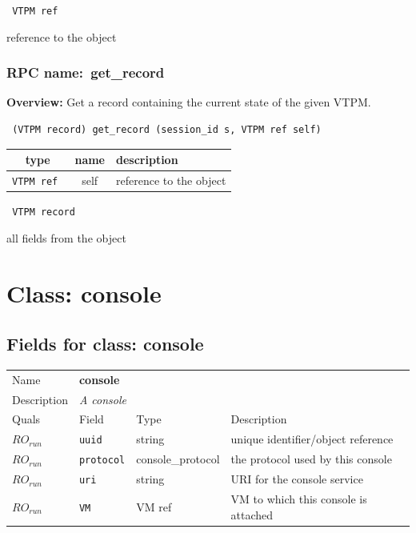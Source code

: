 \vspace{0.3cm}

{\tt 
VTPM ref
}


reference to the object
\vspace{0.3cm}
\vspace{0.3cm}
\vspace{0.3cm}
\subsubsection{RPC name:~get\_record}

{\bf Overview:} 
Get a record containing the current state of the given VTPM.

\begin{verbatim} (VTPM record) get_record (session_id s, VTPM ref self)\end{verbatim}



 
\vspace{0.3cm}
\begin{tabular}{|c|c|p{7cm}|}
 \hline
{\bf type} & {\bf name} & {\bf description} \\ \hline
{\tt VTPM ref } & self & reference to the object \\ \hline 

\end{tabular}

\vspace{0.3cm}

{\tt 
VTPM record
}


all fields from the object
\vspace{0.3cm}
\vspace{0.3cm}
\vspace{0.3cm}

\vspace{1cm}
\newpage
\section{Class: console}
\subsection{Fields for class: console}
\begin{longtable}{|lllp{}|}
\hline
\multicolumn{1}{|l}{Name} & \multicolumn{3}{l|}{\bf console} \\
\multicolumn{1}{|l}{Description} & \multicolumn{3}{l|}{\parbox{11cm}{\em A console}} \\
\hline
Quals & Field & Type & Description \\
\hline
$\mathit{RO}_\mathit{run}$ &  {\tt uuid} & string & unique identifier/object reference \\
$\mathit{RO}_\mathit{run}$ &  {\tt protocol} & console\_protocol & the protocol used by this console \\
$\mathit{RO}_\mathit{run}$ &  {\tt uri} & string & URI for the console service \\
$\mathit{RO}_\mathit{run}$ &  {\tt VM} & VM ref & VM to which this console is attached \\
\hline
\end{longtable}
